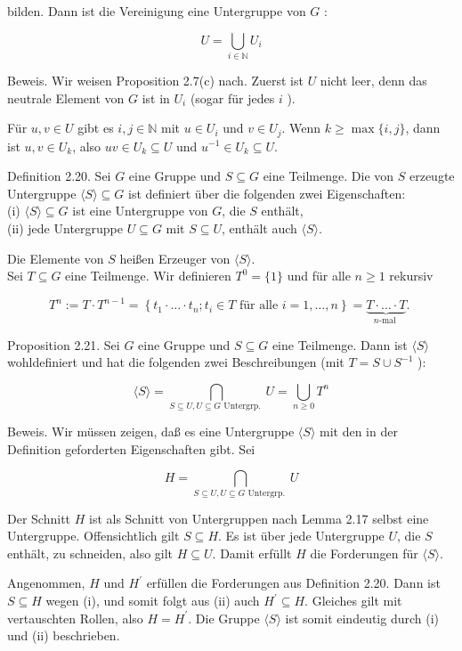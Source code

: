 \documentclass[10pt, letterpaper]{article}
\begin{document}
bilden. Dann ist die Vereinigung eine Untergruppe von $G$ :

$$
U=\bigcup_{i \in \mathbb{N}} U_{i}
$$

Beweis. Wir weisen Proposition 2.7(c) nach. Zuerst ist $U$ nicht leer, denn das neutrale Element von $G$ ist in $U_{i}$ (sogar für jedes $i$ ).

Für $u, v \in U$ gibt es $i, j \in \mathbb{N}$ mit $u \in U_{i}$ und $v \in U_{j}$. Wenn $k \geq \max \{i, j\}$, dann ist $u, v \in U_{k}$, also $u v \in U_{k} \subseteq U$ und $u^{-1} \in U_{k} \subseteq U$.

Definition 2.20. Sei $G$ eine Gruppe und $S \subseteq G$ eine Teilmenge. Die von $S$ erzeugte Untergruppe $\langle S\rangle \subseteq G$ ist definiert über die folgenden zwei Eigenschaften:\\
(i) $\langle S\rangle \subseteq G$ ist eine Untergruppe von $G$, die $S$ enthält,\\
(ii) jede Untergruppe $U \subseteq G$ mit $S \subseteq U$, enthält auch $\langle S\rangle$.

Die Elemente von $S$ heißen Erzeuger von $\langle S\rangle$.\\
Sei $T \subseteq G$ eine Teilmenge. Wir definieren $T^{0}=\{1\}$ und für alle $n \geq 1$ rekursiv

$$
T^{n}:=T \cdot T^{n-1}=\left\{t_{1} \cdot \ldots \cdot t_{n} ; t_{i} \in T \text { für alle } i=1, \ldots, n\right\}=\underbrace{T \cdot \ldots \cdot T}_{n \text {-mal }} \text {. }
$$

Proposition 2.21. Sei $G$ eine Gruppe und $S \subseteq G$ eine Teilmenge. Dann ist $\langle S\rangle$ wohldefiniert und hat die folgenden zwei Beschreibungen (mit $T=S \cup S^{-1}$ ):

$$
\langle S\rangle=\bigcap_{S \subseteq U, U \subseteq G \text { Untergrp. }} U=\bigcup_{n \geq 0} T^{n}
$$

Beweis. Wir müssen zeigen, daß es eine Untergruppe $\langle S\rangle$ mit den in der Definition geforderten Eigenschaften gibt. Sei

$$
H=\bigcap_{S \subseteq U, U \subseteq G \text { Untergrp. }} U
$$

Der Schnitt $H$ ist als Schnitt von Untergruppen nach Lemma 2.17 selbst eine Untergruppe. Offensichtlich gilt $S \subseteq H$. Es ist über jede Untergruppe $U$, die $S$ enthält, zu schneiden, also gilt $H \subseteq U$. Damit erfüllt $H$ die Forderungen für $\langle S\rangle$.

Angenommen, $H$ und $H^{\prime}$ erfüllen die Forderungen aus Definition 2.20. Dann ist $S \subseteq H$ wegen (i), und somit folgt aus (ii) auch $H^{\prime} \subseteq H$. Gleiches gilt mit vertauschten Rollen, also $H=H^{\prime}$. Die Gruppe $\langle S\rangle$ ist somit eindeutig durch (i) und (ii) beschrieben.
\end{document}
